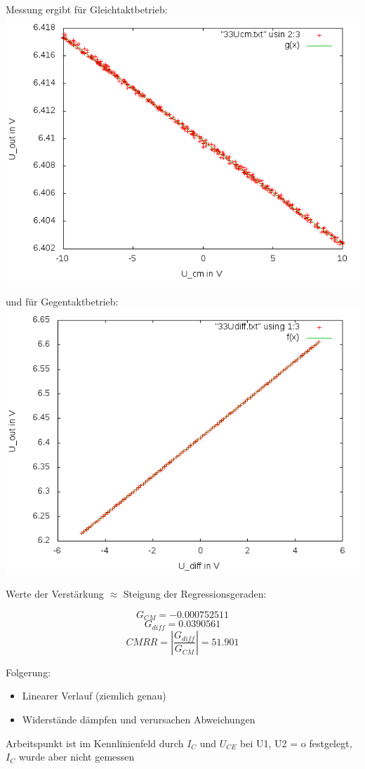 \documentclass[compress,11pt]{beamer}
\begin{document}
\begin{frame}
Messung ergibt für Gleichtaktbetrieb:
\includegraphics[width=.7\textwidth]{../daten/messungen/3aufgabe/1cm}\\
\end{frame}
\begin{frame}
und für Gegentaktbetrieb:
\includegraphics[width=.7\textwidth]{../daten/messungen/3aufgabe/1diff}\\
\end{frame}
\begin{frame}
Werte der Verstärkung $\approx$ Steigung der Regressionsgeraden:

\begin{equation}
G_{CM} = -0.000752511
\end{equation}
\begin{equation}
G_{diff} = 0.0390561
\end{equation}
\begin{equation}
CMRR = |\frac{G_{diff}}{G_{CM}}| = 51.901
\end{equation}

\end{frame}
\begin{frame}
Folgerung:\\
\begin{itemize}
\item Linearer Verlauf (ziemlich genau)
\item Widerstände dämpfen und verursachen Abweichungen
\end{itemize}
Arbeitspunkt ist im Kennlinienfeld durch $I_C$ und $U_{CE}$ bei U1, U2 = o festgelegt, $I_C$ wurde aber nicht gemessen
\end{frame}
\end{document}
